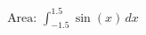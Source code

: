 \documentclass[preview]{standalone}
\begin{document}
\begin{align*}
\text{Area: } \int_{-1.5}^{1.5} \sin(x) \, dx
\end{align*}
\end{document}
